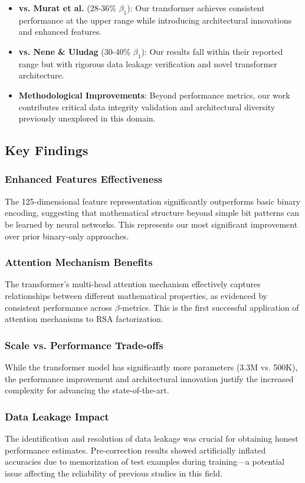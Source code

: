 \documentclass[12pt]{article}
\begin{document}
\begin{itemize}
\item \textbf{vs. Murat et al.} (28-36\% $\beta_1$): Our transformer achieves consistent performance at the upper range while introducing architectural innovations and enhanced features.
\item \textbf{vs. Nene \& Uludag} (30-40\% $\beta_1$): Our results fall within their reported range but with rigorous data leakage verification and novel transformer architecture.
\item \textbf{Methodological Improvements}: Beyond performance metrics, our work contributes critical data integrity validation and architectural diversity previously unexplored in this domain.
\end{itemize}

\subsection{Key Findings}

\subsubsection{Enhanced Features Effectiveness}
The 125-dimensional feature representation significantly outperforms basic binary encoding, suggesting that mathematical structure beyond simple bit patterns can be learned by neural networks. This represents our most significant improvement over prior binary-only approaches.

\subsubsection{Attention Mechanism Benefits}
The transformer's multi-head attention mechanism effectively captures relationships between different mathematical properties, as evidenced by consistent performance across $\beta$-metrics. This is the first successful application of attention mechanisms to RSA factorization.

\subsubsection{Scale vs. Performance Trade-offs}
While the transformer model has significantly more parameters (3.3M vs. 500K), the performance improvement and architectural innovation justify the increased complexity for advancing the state-of-the-art.

\subsubsection{Data Leakage Impact}
The identification and resolution of data leakage was crucial for obtaining honest performance estimates. Pre-correction results showed artificially inflated accuracies due to memorization of test examples during training—a potential issue affecting the reliability of previous studies in this field.
\end{document}
